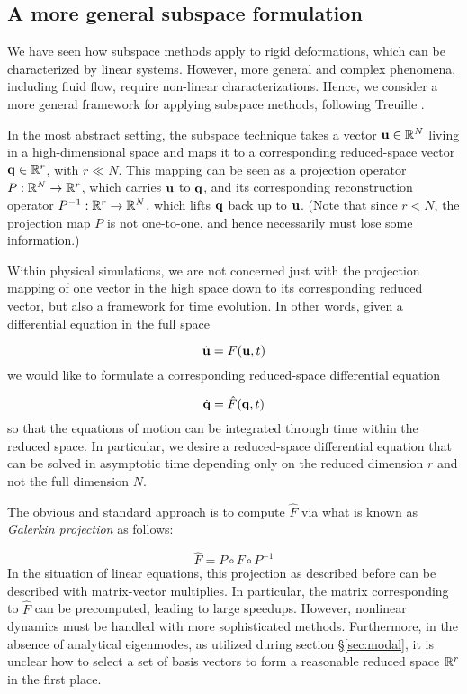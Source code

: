 \subsection{A more general subspace formulation}
We have seen how subspace methods apply to rigid deformations, which can be characterized by linear systems. However, more general and complex phenomena, including fluid flow, require non-linear characterizations. Hence, we consider a more general framework for applying subspace methods, following Treuille 
\cite{Treuille:2006:MRF}.

In the most abstract setting, the subspace technique takes a vector $\mathbf{u} \in \mathbb{R}^N$ living in a high-dimensional space and maps it to a corresponding reduced-space vector $\mathbf{q} \in \mathbb{R}^r$, with $r \ll N$. This mapping can be seen as a projection operator $P : \mathbb{R}^N \rightarrow \mathbb{R}^r$, which carries $\mathbf{u}$ to $\mathbf{q}$, and its corresponding reconstruction operator $P^{-1} : \mathbb{R}^r \rightarrow \mathbb{R}^N$, which lifts $\mathbf{q}$ back up to $\mathbf{u}$. (Note that since $r < N$, the projection map $P$ is not one-to-one, and hence necessarily must lose some information.) 

Within physical simulations, we are not concerned just with the projection mapping of one vector in the high space down to its corresponding reduced vector, but also a framework for time evolution. In other words, given a differential equation in the full space

\begin{equation}
\dot{\mathbf{u}} = F(\mathbf{u}, t)
\end{equation}
we would like to formulate a corresponding reduced-space differential equation

\begin{equation}
\dot{\mathbf{q}} = \hat{F}(\mathbf{q}, t)
\end{equation}
so that the equations of motion can be integrated through time within the reduced space. In particular, we desire a reduced-space differential equation 
that can be solved in asymptotic time depending only on the reduced dimension $r$ and not the full dimension $N$.

The obvious and standard approach is to compute $\hat{F}$ via what is known as {\em Galerkin projection} as follows:

\begin{equation}
\hat{F} = P \circ F \circ P^{-1}
\end{equation}
In the situation of linear equations, this projection as described before can be described with matrix-vector multiplies. In particular, the matrix corresponding
to $\hat{F}$ can be precomputed, leading to large speedups. However, nonlinear dynamics must be handled with more sophisticated methods. Furthermore, in the absence of analytical eigenmodes, as utilized during section \S \ref{sec:modal}, it is unclear how to select a set of basis vectors to form a reasonable reduced space $\mathbb{R}^r$ in the first place. 

